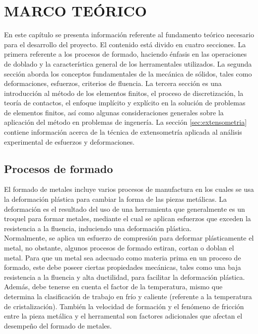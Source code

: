 % 
% 

\chapter{MARCO TEÓRICO}

En este capítulo se presenta información referente al fundamento teórico necesario para el 
desarrollo del proyecto. El contenido está divido en cuatro secciones. La primera referente 
a los procesos de formado, haciendo énfasis en las operaciones de doblado y la 
característica general de los herramentales utilizados. La segunda sección aborda 
los conceptos fundamentales de la mecánica de sólidos, tales como deformaciones, esfuerzos, 
criterios de fluencia. La tercera sección es una introducción al método de los elementos finitos, 
el proceso de discretización, la teoría de contactos, el enfoque implícito y explícito en 
la solución de problemas de elementos finitos, así como algunas consideraciones generales 
sobre la aplicación del método en problemas de ingenería. La sección \ref{sec:extensometria} 
contiene información acerca de la técnica de extensometría aplicada al análisis experimental 
de esfuerzos y deformaciones.

\section{Procesos de formado}

El formado de metales incluye varios procesos de manufactura en los cuales se usa la deformación 
plástica para cambiar la forma de las piezas metálicas. La deformación es el resultado del uso de 
una herramienta que generalmente es un troquel para formar metales, mediante el cual se aplican 
esfuerzos que exceden la resistencia a la fluencia, induciendo una deformación plástica. ~\cite{groover2007}\\

Normalmente, se aplica un esfuerzo de compresión para deformar plásticamente el metal, no obstante, 
algunos procesos de formado estiran, cortan o doblan el metal. Para que un metal sea adecuado 
como materia prima en un proceso de formado, este debe poseer ciertas propiedades mecánicas, 
tales como una baja resistencia a la fluencia y alta ductilidad, para facilitar la deformación 
plástica. Además, debe tenerse en cuenta el factor de la temperatura, mismo que determina 
la clasificación de trabajo en frío y caliente (referente a la temperatura de cristalización). 
También la velocidad de formación y el fenómeno de fricción entre la pieza metálica y el herramental 
son factores adicionales que afectan el desempeño del formado de metales.


